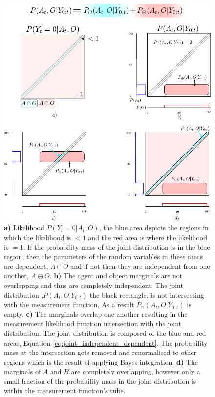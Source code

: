 %
 
 \begin{figure}
 \centering
  \includegraphics[width=\textwidth]{./ch5-MLMF/Figures/Figure7.pdf}
  \caption{
  \textbf{a)} Likelihood $P(Y_t=0|A_t,O)$, the blue area depicts the regions in which the likelihood is $<1$ 
  and the red area is where the likelihood is $=1$. If the probability mass of the joint distribution 
  is in the blue region, then the parameters of the random variables in these areas are dependent, $A \cap O$
  and if not then they are independent from one another, $A \ominus O$.  
   \textbf{b)} The agent and object marginals are not overlapping and thus are completely independent. The joint distribution 
   ,$P(A_t,O|Y_{0:t})$ the black rectangle,  is not intersecting with the measurement function. As a result $P_{\cap}(A_t,O|Y_{0:t})$
   is empty.
 \textbf{c)} The marginals overlap one another resulting in the measurement likelihood function intersection with the joint distribution.
 The joint distribution is composed of the blue and red areas, Equation \ref{eq:joint_independent_dependent}.
 The probability mass at the intersection gets removed and renormalised to other regions which is the result of applying Bayes integration. 
 \textbf{d)} The marginals of $A$ and $B$ are completely overlapping, however only a small fraction of the probability mass 
 in the joint distribution is within the measurement function's tube.}
  \label{fig:overlap_dependence_independence}
\end{figure}

